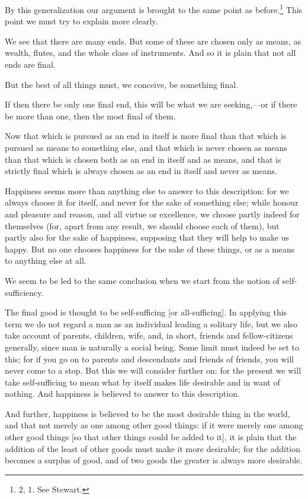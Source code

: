 By this generalization our argument is brought to the same point as
before.\footnote{2, 1. See Stewart.} This point we must try to explain
more clearly.

We see that there are many ends. But some of these are chosen only as
means, as wealth, flutes, and the whole class of instruments. And so
it is plain that not all ends are final.

But the best of all things must, we conceive, be something final.

If then there be only one final end, this will be what we are
seeking,---or if there be more than one, then the most final of them.

Now that which is pursued as an end in itself is more final than that
which is pursued as means to something else, and that which is never
chosen as means than that which is chosen both as an end in itself and
as means, and that is strictly final which  is always chosen
as an end in itself and never as means.

Happiness seems more than anything else to answer to this description:
for we always choose it for itself, and never for the sake of
something else; while honour and pleasure and reason, and all virtue
or excellence, we choose partly indeed for themselves (for, apart from
any result, we should choose each of them), but partly also for the
sake of happiness, supposing that they will help to make us happy. But
no one chooses happiness for the sake of these things, or as a means
to anything else at all.

We seem to be led to the same conclusion when we start from the notion
of self-sufficiency.

The final good is thought to be self-sufficing [or all-sufficing]. In
applying this term we do not regard a man as an individual leading a
solitary life, but we also take account of parents, children, wife,
and, in short, friends and fellow-citizens generally, since man is
naturally a social being. Some limit must indeed be set to this; for
if you go on to parents and descendants and friends of friends, you
will never come to a stop. But this we will consider further on: for
the present we will take self-sufficing to mean what by itself makes
life desirable and in want of nothing. And happiness is believed to
answer to this description.

And further, happiness is believed to be the most desirable thing in
the world, and that not merely as one among other good things: if it
were merely one among other good things [so that other things could be
added to it], it is plain that the addition of the least  of
other goods must make it more desirable; for the addition becomes a
surplus of good, and of two goods the greater is always more
desirable.

